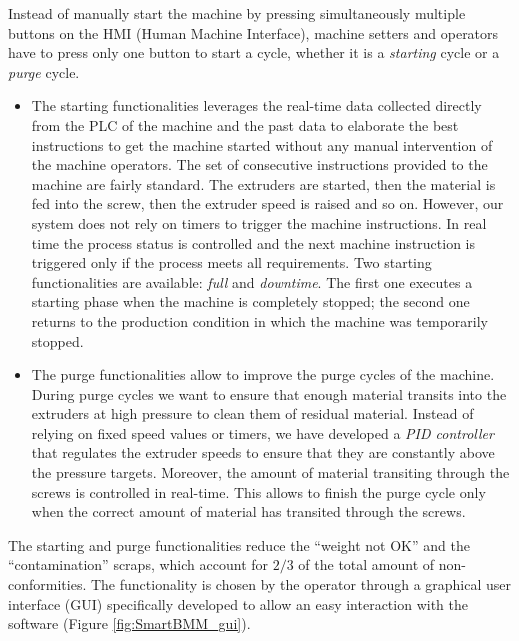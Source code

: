 Instead of manually start the machine by pressing simultaneously multiple buttons on the HMI (Human Machine Interface), machine setters and operators have to press only one button to start a cycle, whether it is a \textit{starting} cycle or a \textit{purge} cycle.  

\begin{itemize}
    \item The starting functionalities leverages the real-time data collected directly from the PLC of the machine and the past data to elaborate the best instructions to get the machine started without any manual intervention of the machine operators. The set of consecutive instructions provided to the machine are fairly standard. The extruders are started, then the material is fed into the screw, then the extruder speed is raised and so on. However, our system does not rely on timers to trigger the machine instructions. In real time the process status is controlled and the next machine instruction is triggered only if the process meets all requirements.
    Two starting functionalities are available: \textit{full} and \textit{downtime}. The first one executes a starting phase when the machine is completely stopped; the second one returns to the production condition in which the machine was temporarily stopped.
    \item The purge functionalities allow to improve the purge cycles of the machine.
    During purge cycles we want to ensure that enough material transits into the extruders at high pressure to clean them of residual material. Instead of relying on fixed speed values or timers, we have developed a \textit{PID controller} that regulates the extruder speeds to ensure that they are constantly above the pressure targets. Moreover, the amount of material transiting through the screws is controlled in real-time. This allows to finish the purge cycle only when the correct amount of material has transited through the screws.     
\end{itemize}
%
The starting and purge functionalities reduce the ``weight not OK'' and the ``contamination'' scraps, which account for $2/3$ of the total amount of non-conformities.
The functionality is chosen by the operator through a graphical user interface (GUI) specifically developed to allow an easy interaction with the software (Figure \ref{fig:SmartBMM_gui}).
